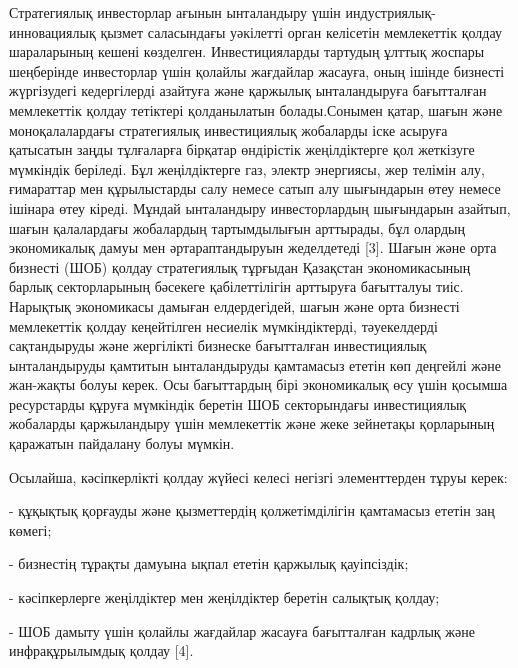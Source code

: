 \begin{multicols}{2}
Стратегиялық инвесторлар ағынын ынталандыру үшін
индустриялық-инновациялық қызмет саласындағы уәкілетті орган келісетін
мемлекеттік қолдау шараларының кешені көзделген. Инвестицияларды
тартудың ұлттық жоспары шеңберінде инвесторлар үшін қолайлы жағдайлар
жасауға, оның ішінде бизнесті жүргізудегі кедергілерді азайтуға және
қаржылық ынталандыруға бағытталған мемлекеттік қолдау тетіктері
қолданылатын болады.Сонымен қатар, шағын және моноқалалардағы
стратегиялық инвестициялық жобаларды іске асыруға қатысатын заңды
тұлғаларға бірқатар өндірістік жеңілдіктерге қол жеткізуге мүмкіндік
беріледі. Бұл жеңілдіктерге газ, электр энергиясы, жер телімін алу,
ғимараттар мен құрылыстарды салу немесе сатып алу шығындарын өтеу немесе
ішінара өтеу кіреді. Мұндай ынталандыру инвесторлардың шығындарын
азайтып, шағын қалалардағы жобалардың тартымдылығын арттырады, бұл
олардың экономикалық дамуы мен әртараптандыруын жеделдетеді {[}3{]}.
Шағын және орта бизнесті (ШОБ) қолдау стратегиялық тұрғыдан Қазақстан
экономикасының барлық секторларының бәсекеге қабілеттілігін арттыруға
бағытталуы тиіс. Нарықтық экономикасы дамыған елдердегідей, шағын және
орта бизнесті мемлекеттік қолдау кеңейтілген несиелік мүмкіндіктерді,
тәуекелдерді сақтандыруды және жергілікті бизнеске бағытталған
инвестициялық ынталандыруды қамтитын ынталандыруды қамтамасыз ететін көп
деңгейлі және жан-жақты болуы керек. Осы бағыттардың бірі экономикалық
өсу үшін қосымша ресурстарды құруға мүмкіндік беретін ШОБ секторындағы
инвестициялық жобаларды қаржыландыру үшін мемлекеттік және жеке
зейнетақы қорларының қаражатын пайдалану болуы мүмкін.

Осылайша, кәсіпкерлікті қолдау жүйесі келесі негізгі элементтерден тұруы
керек:

- құқықтық қорғауды және қызметтердің қолжетімділігін қамтамасыз ететін
заң көмегі;

- бизнестің тұрақты дамуына ықпал ететін қаржылық қауіпсіздік;

- кәсіпкерлерге жеңілдіктер мен жеңілдіктер беретін салықтық қолдау;

- ШОБ дамыту үшін қолайлы жағдайлар жасауға бағытталған кадрлық және
инфрақұрылымдық қолдау {[}4{]}.


\end{multicols}
